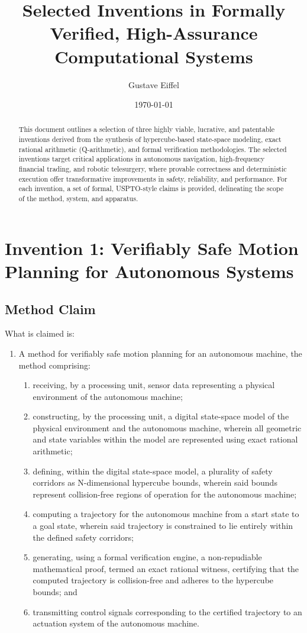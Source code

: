 \documentclass{article}
\title{\textbf{Selected Inventions in Formally Verified, High-Assurance Computational Systems}}
\author{Gustave Eiffel}
\date{\today}
\begin{document}
\maketitle

\begin{abstract}
This document outlines a selection of three highly viable, lucrative, and patentable inventions derived from the synthesis of hypercube-based state-space modeling, exact rational arithmetic (Q-arithmetic), and formal verification methodologies. The selected inventions target critical applications in autonomous navigation, high-frequency financial trading, and robotic telesurgery, where provable correctness and deterministic execution offer transformative improvements in safety, reliability, and performance. For each invention, a set of formal, USPTO-style claims is provided, delineating the scope of the method, system, and apparatus.
\end{abstract}

\section{Invention 1: Verifiably Safe Motion Planning for Autonomous Systems}
\subsection{Method Claim}
\noindent What is claimed is:
\begin{enumerate}
    \item A method for verifiably safe motion planning for an autonomous machine, the method comprising:
    \begin{enumerate}
        \item[(a)] receiving, by a processing unit, sensor data representing a physical environment of the autonomous machine;
        \item[(b)] constructing, by the processing unit, a digital state-space model of the physical environment and the autonomous machine, wherein all geometric and state variables within the model are represented using exact rational arithmetic;
        \item[(c)] defining, within the digital state-space model, a plurality of safety corridors as N-dimensional hypercube bounds, wherein said bounds represent collision-free regions of operation for the autonomous machine;
        \item[(d)] computing a trajectory for the autonomous machine from a start state to a goal state, wherein said trajectory is constrained to lie entirely within the defined safety corridors;
        \item[(e)] generating, using a formal verification engine, a non-repudiable mathematical proof, termed an exact rational witness, certifying that the computed trajectory is collision-free and adheres to the hypercube bounds; and
        \item[(f)] transmitting control signals corresponding to the certified trajectory to an actuation system of the autonomous machine.
    \end{enumerate}
\end{enumerate}
\end{document}
